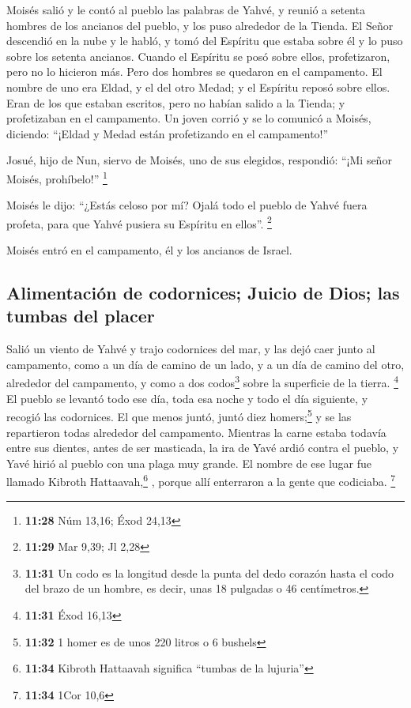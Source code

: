  Moisés salió y le contó al pueblo las palabras de Yahvé,
y reunió a setenta hombres de los ancianos del pueblo, y los puso
alrededor de la Tienda.  El Señor descendió en la nube y
le habló, y tomó del Espíritu que estaba sobre él y lo puso sobre los
setenta ancianos. Cuando el Espíritu se posó sobre ellos, profetizaron,
pero no lo hicieron más.  Pero dos hombres se quedaron en
el campamento. El nombre de uno era Eldad, y el del otro Medad; y el
Espíritu reposó sobre ellos. Eran de los que estaban escritos, pero no
habían salido a la Tienda; y profetizaban en el campamento.
 Un joven corrió y se lo comunicó a Moisés, diciendo:
``¡Eldad y Medad están profetizando en el campamento!''

 Josué, hijo de Nun, siervo de Moisés, uno de sus
elegidos, respondió: ``¡Mi señor Moisés, prohíbelo!'' \footnote{\textbf{11:28}
  Núm 13,16; Éxod 24,13}

 Moisés le dijo: ``¿Estás celoso por mí? Ojalá todo el
pueblo de Yahvé fuera profeta, para que Yahvé pusiera su Espíritu en
ellos''. \footnote{\textbf{11:29} Mar 9,39; Jl 2,28}

 Moisés entró en el campamento, él y los ancianos de
Israel.

\hypertarget{alimentaciuxf3n-de-codornices-juicio-de-dios-las-tumbas-del-placer}{%
\subsection{Alimentación de codornices; Juicio de Dios; las tumbas del
placer}\label{alimentaciuxf3n-de-codornices-juicio-de-dios-las-tumbas-del-placer}}

 Salió un viento de Yahvé y trajo codornices del mar, y
las dejó caer junto al campamento, como a un día de camino de un lado, y
a un día de camino del otro, alrededor del campamento, y como a dos
codos\footnote{\textbf{11:31} Un codo es la longitud desde la punta del
  dedo corazón hasta el codo del brazo de un hombre, es decir, unas 18
  pulgadas o 46 centímetros.} sobre la superficie de la tierra.
\footnote{\textbf{11:31} Éxod 16,13}  El pueblo se
levantó todo ese día, toda esa noche y todo el día siguiente, y recogió
las codornices. El que menos juntó, juntó diez homers;\footnote{\textbf{11:32}
  1 homer es de unos 220 litros o 6 bushels} y se las repartieron todas
alrededor del campamento.  Mientras la carne estaba
todavía entre sus dientes, antes de ser masticada, la ira de Yavé ardió
contra el pueblo, y Yavé hirió al pueblo con una plaga muy grande.
 El nombre de ese lugar fue llamado Kibroth
Hattaavah,\footnote{\textbf{11:34} Kibroth Hattaavah significa ``tumbas
  de la lujuria''} , porque allí enterraron a la gente que codiciaba.
\footnote{\textbf{11:34} 1Cor 10,6}

